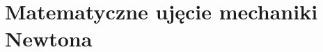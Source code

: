 \documentclass[a4paper,11pt]{article}
\begin{document}
\vspace{\spaceTwo}










\newpage
\section{Matematyczne ujęcie mechaniki Newtona}

\vspace{\spaceTwo}



















\end{document}
